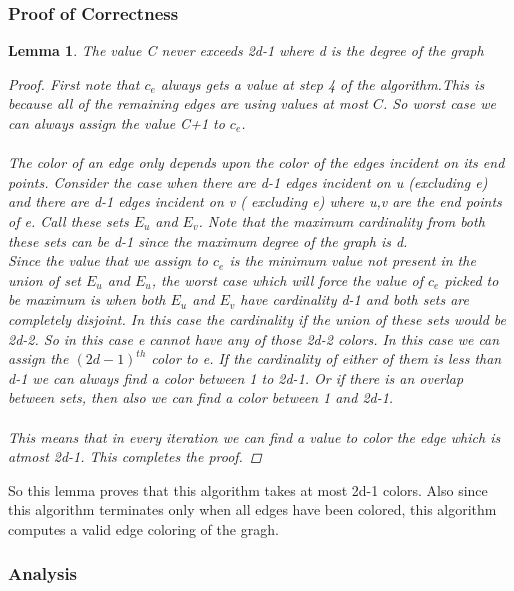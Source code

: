 \documentclass[11pt]{article}
\newtheorem{lemma}[theorem]{Lemma}
\begin{document}
\subsubsection{Proof of Correctness}
\begin{lemma}
The value C never exceeds 2d-1 where d is the degree of the graph
\begin{proof}
First  note that $c_e$ always gets a value at step 4 of the algorithm.This is because all of the remaining edges are using values at most $C$. So worst case we can always assign the value C+1 to $c_e$. \\\\The color of an edge only depends upon the color of the edges incident on its end points.  Consider the case when there are d-1 edges incident on u (excluding e) and there are d-1 edges incident on  v ( excluding e) where u,v are the end points of e.  Call these sets $E_u$ and $E_v$. Note that the maximum cardinality from both these sets can be d-1 since the maximum degree of the graph is d.\\
Since the value that we assign to $c_e$ is the minimum value not present in the union of set $E_u$ and $E_u$, the worst case which will force the value of $c_e$ picked to be maximum is when both $E_u$ and $E_v$ have cardinality d-1 and both sets are completely disjoint. In this case the cardinality if the union of these sets would be 2d-2. So in this case e cannot have any of those 2d-2 colors. In this case we can assign the $(2d-1)^{th}$ color to e. If the cardinality of either of them is less than d-1 we can always find a color between 1 to 2d-1. Or if there is an overlap between sets, then also we can find a color between 1 and 2d-1. \\\\
This means that in every iteration we can find a value to color the edge which is atmost 2d-1. This completes the proof.
\end{proof}
\end{lemma}

So this lemma proves that this algorithm takes at most 2d-1 colors.
Also since this algorithm terminates only when all edges have been colored, this algorithm computes a valid edge coloring of the gragh.

\subsubsection{Analysis}
\end{document}
